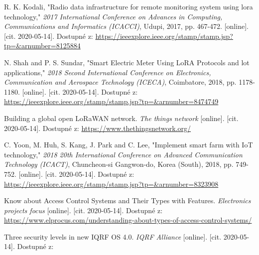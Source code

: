 \begin{thebibliography}{9}
R. K. Kodali, "Radio data infrastructure for remote monitoring system using lora technology," \textit{2017 International Conference on Advances in Computing, Communications and Informatics (ICACCI)}, Udupi, 2017, pp. 467-472.
[online]. [cit. 2020-05-14]. Dostupné z: 
\url{
https://ieeexplore.ieee.org/stamp/stamp.jsp?tp=&arnumber=8125884
}
 


N. Shah and P. S. Sundar, "Smart Electric Meter Using LoRA Protocols and lot applications," \textit{2018 Second International Conference on Electronics, Communication and Aerospace Technology (ICECA)}, Coimbatore, 2018, pp. 1178-1180.
[online]. [cit. 2020-05-14]. Dostupné z: 
\url{
https://ieeexplore.ieee.org/stamp/stamp.jsp?tp=&arnumber=8474749
}
 


Building a global open LoRaWAN network. \textit{ The things network } [online]. [cit. 2020-05-14]. Dostupné z: 
\url{
https://www.thethingsnetwork.org/
}



C. Yoon, M. Huh, S. Kang, J. Park and C. Lee, "Implement smart farm with IoT technology," \textit{2018 20th International Conference on Advanced Communication Technology (ICACT)}, Chuncheon-si Gangwon-do, Korea (South), 2018, pp. 749-752.
[online]. [cit. 2020-05-14]. Dostupné z: 
\url{
https://ieeexplore.ieee.org/stamp/stamp.jsp?tp=&arnumber=8323908
}
 



Know about Access Control Systems and Their Types with Features. \textit{Electronics projects focus}
[online]. [cit. 2020-05-14]. Dostupné z: 
\url{
https://www.elprocus.com/understanding-about-types-of-access-control-systems/
}
 




Three security levels in new IQRF OS 4.0. \textit{IQRF Alliance } [online]. [cit. 2020-05-14]. Dostupné z: 
\cite{
https://www.iqrfalliance.org/news/117-three-security-levels-in-new-iqrf-os-4-0
}



\end{thebibliography}
